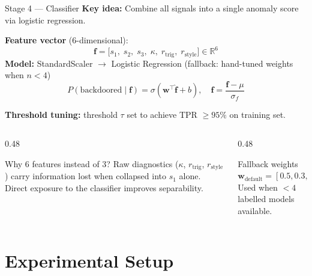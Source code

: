 \documentclass[aspectratio=169]{beamer}
\begin{document}
\begin{frame}{Stage 4 --- Classifier}
\textbf{Key idea:} Combine all signals into a single anomaly score via logistic regression.

\vspace{0.4em}
\textbf{Feature vector} (6-dimensional):
\[
  \mathbf{f} = \bigl[s_1,\; s_2,\; s_3,\; \kappa,\; r_{\text{trig}},\; r_{\text{style}}\bigr] \in \mathbb{R}^6
\]
\textbf{Model:} StandardScaler $\rightarrow$ Logistic Regression (fallback: hand-tuned weights when $n < 4$)
\[
  P(\text{backdoored} \mid \mathbf{f}) = \sigma\!\left(\mathbf{w}^\top \hat{\mathbf{f}} + b\right), \quad \hat{\mathbf{f}} = \frac{\mathbf{f} - \mu}{\sigma_f}
\]

\textbf{Threshold tuning:} threshold $\tau$ set to achieve TPR $\geq 95\%$ on training set.

\vspace{0.4em}
\begin{columns}
\begin{column}{0.48\textwidth}
  \begin{block}{Why 6 features instead of 3?}
    Raw diagnostics ($\kappa$, $r_{\text{trig}}$, $r_{\text{style}}$) carry information lost when collapsed into $s_1$ alone. Direct exposure to the classifier improves separability.
  \end{block}
\end{column}
\begin{column}{0.48\textwidth}
  \begin{block}{Fallback weights}
    $\mathbf{w}_{\text{default}} = [0.5, 0.3, 0.4, 0.1, 0.3, 0.2]$\\
    Used when $< 4$ labelled models available.
  \end{block}
\end{column}
\end{columns}
\end{frame}

\section{Experimental Setup}
\end{document}
